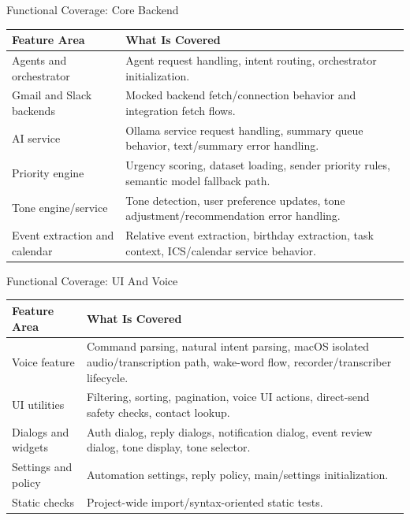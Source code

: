\begin{frame}{Functional Coverage: Core Backend}
\scriptsize
\begin{tabular}{p{}p{}}
\hline
\textbf{Feature Area} & \textbf{What Is Covered}\\
\hline
Agents and orchestrator & Agent request handling, intent routing, orchestrator initialization.\\
Gmail and Slack backends & Mocked backend fetch/connection behavior and integration fetch flows.\\
AI service & Ollama service request handling, summary queue behavior, text/summary error handling.\\
Priority engine & Urgency scoring, dataset loading, sender priority rules, semantic model fallback path.\\
Tone engine/service & Tone detection, user preference updates, tone adjustment/recommendation error handling.\\
Event extraction and calendar & Relative event extraction, birthday extraction, task context, ICS/calendar service behavior.\\
\hline
\end{tabular}
\end{frame}

\begin{frame}{Functional Coverage: UI And Voice}
\scriptsize
\begin{tabular}{p{}p{}}
\hline
\textbf{Feature Area} & \textbf{What Is Covered}\\
\hline
Voice feature & Command parsing, natural intent parsing, macOS isolated audio/transcription path, wake-word flow, recorder/transcriber lifecycle.\\
UI utilities & Filtering, sorting, pagination, voice UI actions, direct-send safety checks, contact lookup.\\
Dialogs and widgets & Auth dialog, reply dialogs, notification dialog, event review dialog, tone display, tone selector.\\
Settings and policy & Automation settings, reply policy, main/settings initialization.\\
Static checks & Project-wide import/syntax-oriented static tests.\\
\hline
\end{tabular}
\end{frame}

